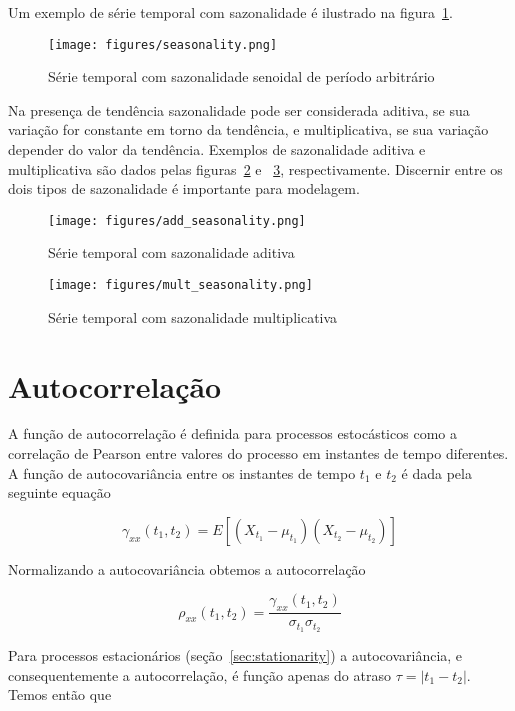 Um exemplo de série temporal com sazonalidade é ilustrado na
figura~\ref{fig:seasonality}.

\begin{figure}[H]
    \centering
    \texttt{[image: figures/seasonality.png]}
    \caption{Série temporal com sazonalidade senoidal de período arbitrário}
    \label{fig:seasonality}
\end{figure}

Na presença de tendência sazonalidade pode ser considerada aditiva, se sua
variação for constante em torno da tendência, e multiplicativa, se sua variação
depender do valor da tendência. Exemplos de sazonalidade aditiva e
multiplicativa são dados pelas figuras~\ref{fig:add_seasonality} e
~\ref{fig:mult_seasonality}, respectivamente. Discernir entre os dois tipos de
sazonalidade é importante para modelagem.

\begin{figure}[H]
    \centering
    \texttt{[image: figures/add\_seasonality.png]}
    \caption{Série temporal com sazonalidade aditiva}
    \label{fig:add_seasonality}
\end{figure}

\begin{figure}[H]
    \centering
    \texttt{[image: figures/mult\_seasonality.png]}
    \caption{Série temporal com sazonalidade multiplicativa}
    \label{fig:mult_seasonality}
\end{figure}


\section{Autocorrelação}

A função de autocorrelação é definida para processos estocásticos como a
correlação de Pearson entre valores do processo em instantes de tempo
diferentes. A função de autocovariância entre os instantes de tempo $t_1$ e
$t_2$ é dada pela seguinte equação

\begin{equation}\label{eq:raw_autocorr}
    \gamma_{xx}(t_1, t_2) = E[(X_{t_1} - \mu_{t_1})(X_{t_2} -\mu_{t_2})]
\end{equation}

Normalizando a autocovariância obtemos a autocorrelação

$$\rho_{xx}(t_1, t_2) =\frac{\gamma_{xx}(t_1, t_2)}{\sigma_{t_1}\sigma_{t_2}}$$

Para processos estacionários (seção~\ref{sec:stationarity}) a autocovariância,
e consequentemente a autocorrelação, é função apenas do atraso $\tau = |t_1 -
t_2|$. Temos então que

